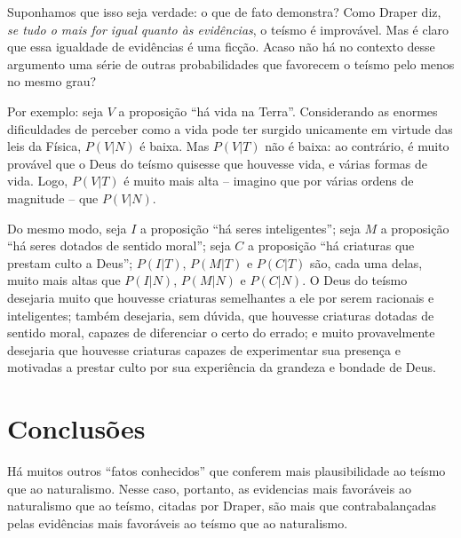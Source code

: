 \documentclass[11pt, a5paper]{exam}
\begin{document}
Suponhamos que isso seja verdade: o que de fato demonstra? 
Como Draper diz, \textit{se tudo o mais for igual quanto às evidências}, o 
teísmo é improvável. 
Mas é claro que essa igualdade de evidências é uma ficção. 
Acaso não há no contexto desse argumento uma série de outras probabilidades que 
favorecem o teísmo pelo menos no mesmo grau?

Por exemplo: seja $ V $ a proposição ``há vida na Terra''. 
Considerando as enormes dificuldades de perceber como a vida pode ter surgido 
unicamente em virtude das leis da Física, $ P(V | N ) $ é baixa. 
Mas $ P(V | T) $ não é baixa: ao contrário, é muito provável que o Deus do 
teísmo quisesse que houvesse vida, e várias formas de vida. 
Logo, $ P(V | T) $ é muito mais alta -- imagino que por várias ordens de 
magnitude -- que $ P(V | N) $. 

Do mesmo modo, seja $ I $ a proposição ``há seres inteligentes''; seja $ M $ a 
proposição ``há seres dotados de sentido moral''; seja $ C $ a proposição ``há 
criaturas que prestam culto a Deus''; $ P(I|T) $, $ P(M|T) $ e $ P(C|T) $ são, 
cada uma delas, muito mais altas que $ P(I|N) $, $ P(M|N) $ e $ P(C|N) $. 
O Deus do teísmo desejaria muito que houvesse criaturas semelhantes a ele por 
serem racionais e inteligentes; também desejaria, sem dúvida, que houvesse 
criaturas dotadas de sentido moral, capazes de diferenciar o certo do errado; e 
muito provavelmente desejaria que houvesse criaturas capazes de experimentar sua 
presença e motivadas a prestar culto por sua experiência da grandeza e bondade 
de Deus. 

\section{Conclusões}

Há muitos outros ``fatos conhecidos'' que conferem mais plausibilidade ao teísmo 
que ao naturalismo. 
Nesse caso, portanto, as evidencias mais favoráveis ao naturalismo que ao 
teísmo, citadas por Draper, são mais que contrabalançadas pelas evidências mais 
favoráveis ao teísmo que ao naturalismo.

%
\end{document}
